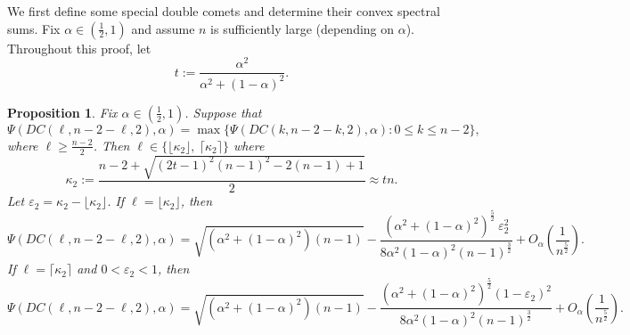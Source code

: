 \documentclass[11pt]{article}
\theoremstyle{plain}
\newtheorem{proposition}[theorem]{Proposition}
\numberwithin{equation}{section}
\begin{document}
We first define some special double comets and determine their convex spectral sums. Fix $\alpha \in (\frac{1}{2}, 1)$ and assume $n$ is sufficiently large (depending on $\alpha$). Throughout this proof, let  
\[t:=\frac{\alpha^2}{\alpha^2 + (1-\alpha)^2}.\] 

\begin{proposition}\label{prop:DC_path_2_alpha}
Fix $\alpha \in (\frac{1}{2}, 1)$. Suppose that 
\[ \Psi(DC(\ell,n-2-\ell, 2), \alpha) = \max\{\Psi(DC(k,n-2-k, 2), \alpha): 0\le k\le n-2\},\]
where $\ell \ge \frac{n-2}{2}$. Then $\ell\in \{\lfloor\kappa_2\rfloor, \ \lceil \kappa_2\rceil\}$
where 
\[ \kappa_2 := \frac{n-2+\sqrt{(2t-1)^2(n-1)^2-2(n-1)+1}}{2}\approx tn.\]
Let $\varepsilon_2 = \kappa_2 - \lfloor \kappa_2\rfloor$. If $\ell = \lfloor\kappa_2\rfloor$, then 
\[ \Psi(DC(\ell, n-2-\ell, 2), \alpha) = \sqrt{(\alpha^2+(1-\alpha)^2)(n-1)}- \frac{(\alpha^2+(1-\alpha)^2)^{\frac{5}{2}}\ \varepsilon_2^2}{8\alpha^2(1-\alpha)^2(n-1)^{\frac{3}{2}}} + O_\alpha\left(\frac{1}{n^{\frac{5}{2}}}\right).\]
If $\ell = \lceil \kappa_2\rceil$ and $0<\varepsilon_2 < 1$, then 
\[ \Psi(DC(\ell, n-2-\ell, 2), \alpha) =\sqrt{(\alpha^2+(1-\alpha)^2)(n-1)}-\frac{(\alpha^2+(1-\alpha)^2)^{\frac{5}{2}}(1-\varepsilon_2)^2}{8\alpha^2(1-\alpha)^2(n-1)^{\frac{3}{2}}} + O_\alpha\left(\frac{1}{n^{\frac{5}{2}}}\right).\]
\end{proposition}
\end{document}
